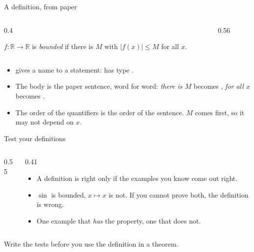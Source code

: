 \documentclass[10pt, aspectratio=169]{beamer}
\begin{document}
\begin{frame}[fragile]{A definition, from paper}
\begin{columns}[T]
\begin{column}{0.4\textwidth}
\begin{paper}[Definition]
$f : \mathbb{R} \to \mathbb{R}$ is \emph{bounded} if there is $M$ with $|f(x)| \le M$ for all $x$.
\end{paper}
\end{column}
\begin{column}{0.56\textwidth}
\leanlabel
{}
\end{column}
\end{columns}

\vspace{0.6em}
\begin{itemize}
\item {} gives a name to a statement:  has type .
\item The body is the paper sentence, word for word: \emph{there is $M$} becomes , \emph{for all $x$} becomes .
\item The order of the quantifiers is the order of the sentence. $M$ comes first, so it may not depend on $x$.
\end{itemize}
\end{frame}

\begin{frame}[fragile]{Test your definitions\livedemo}
\begin{columns}[T]
\begin{column}{0.55\textwidth}
\end{column}
\begin{column}{0.41\textwidth}
\begin{itemize}
\item A definition is right only if the examples you know come out right.
\item $\sin$ is bounded, $x \mapsto x$ is not. If you cannot prove both, the definition is wrong.
\item One example that \emph{has} the property, one that does not.
\end{itemize}
\end{column}
\end{columns}

\vspace{0.6em}
\begin{keypoint}
\normalsize Write the tests before you use the definition in a theorem.
\end{keypoint}
\end{frame}
\end{document}

